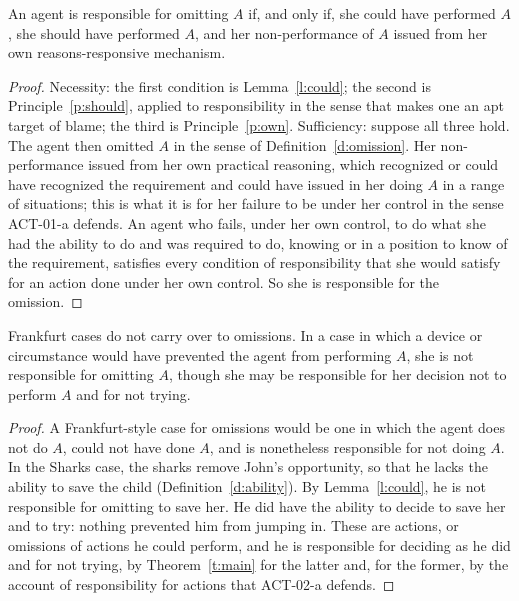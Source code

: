 \documentclass{situationist-preprint}
\begin{document}
\begin{theorem}\label{t:main}
An agent is responsible for omitting $A$ if, and only if, she could have performed $A$, she should have performed $A$, and her non-performance of $A$ issued from her own reasons-responsive mechanism.
\end{theorem}

\begin{proof}
Necessity: the first condition is Lemma~\ref{l:could}; the second is Principle~\ref{p:should}, applied to responsibility in the sense that makes one an apt target of blame; the third is Principle~\ref{p:own}. Sufficiency: suppose all three hold. The agent then omitted $A$ in the sense of Definition~\ref{d:omission}. Her non-performance issued from her own practical reasoning, which recognized or could have recognized the requirement and could have issued in her doing $A$ in a range of situations; this is what it is for her failure to be under her control in the sense ACT-01-a defends. An agent who fails, under her own control, to do what she had the ability to do and was required to do, knowing or in a position to know of the requirement, satisfies every condition of responsibility that she would satisfy for an action done under her own control. So she is responsible for the omission.
\end{proof}

\begin{corollary}\label{c:frankfurt}
Frankfurt cases do not carry over to omissions. In a case in which a device or circumstance would have prevented the agent from performing $A$, she is not responsible for omitting $A$, though she may be responsible for her decision not to perform $A$ and for not trying.
\end{corollary}

\begin{proof}
A Frankfurt-style case for omissions would be one in which the agent does not do $A$, could not have done $A$, and is nonetheless responsible for not doing $A$. In the Sharks case, the sharks remove John's opportunity, so that he lacks the ability to save the child (Definition~\ref{d:ability}). By Lemma~\ref{l:could}, he is not responsible for omitting to save her. He did have the ability to decide to save her and to try: nothing prevented him from jumping in. These are actions, or omissions of actions he could perform, and he is responsible for deciding as he did and for not trying, by Theorem~\ref{t:main} for the latter and, for the former, by the account of responsibility for actions that ACT-02-a defends.
\end{proof}
\end{document}
